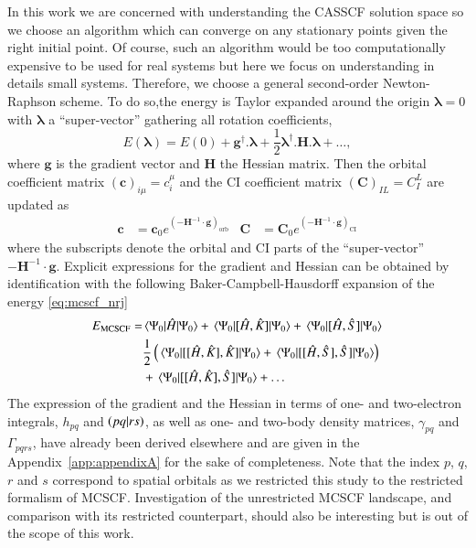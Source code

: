 \documentclass[aps,prb,reprint,showkeys,superscriptaddress]{revtex4-1}
\begin{document}
In this work we are concerned with understanding the CASSCF solution space so we choose an algorithm which can converge on any stationary points given the right initial point.
Of course, such an algorithm would be too computationally expensive to be used for real systems but here we focus on understanding in details small systems.
Therefore, we choose a general second-order Newton-Raphson scheme. \cite{Olsen_1983}
To do so,the energy is Taylor expanded around the origin $\bm{\lambda}=0$ with $\bm{\lambda}$ a ``super-vector'' gathering all rotation coefficients,
\begin{equation}
  \label{eq:mcscf_nrj_taylor}
  E(\bm{\lambda}) = E(0) + \bm{g}^\dagger.\bm{\lambda} + \frac{1}{2} \bm{\lambda}^\dagger.\boldsymbol{H}.\bm{\lambda} + \dots,
\end{equation}
where $\bm{g}$ is the gradient vector and $\bm{H}$ the Hessian matrix.
Then the orbital coefficient matrix $(\bm{c})_{i \mu} = c_i^\mu$ and the CI coefficient matrix $(\bm{C})_{IL} = C_I^L$ are updated as
\begin{align}
  \bm{c} &= \bm{c}_0 e^{(-\bm{H}^{-1}\cdot \bm{g})_{\text{orb}}} & \bm{C} &= \bm{C}_0 e^{(-\bm{H}^{-1}\cdot \bm{g})_{\text{CI}}}
\end{align}
where the subscripts denote the orbital and CI parts of the ``super-vector'' $-\bm{H}^{-1}\cdot \bm{g}$.
Explicit expressions for the gradient and Hessian can be obtained by identification with the following Baker-Campbell-Hausdorff expansion of the energy \eqref{eq:mcscf_nrj}
\begin{equation}
  \label{eq:mcscf_nrj_bch}
  \begin{split}
    E_{\text{MCSCF}} = &\mel{\Psi_0}{\Hat{H}}{\Psi_0} + \mel{\Psi_0}{[\Hat{H},\Hat{K}]}{\Psi_0} + \mel{\Psi_0}{[\Hat{H},\Hat{S}]}{\Psi_0}  \\
    &\frac{1}{2} \left(\mel{\Psi_0}{[[\Hat{H},\Hat{K}],\Hat{K}]}{\Psi_0}+ \mel{\Psi_0}{[[\Hat{H},\Hat{S}],\Hat{S}]}{\Psi_0}\right) \\
    &+ \mel{\Psi_0}{[[\Hat{H},\Hat{K}],\Hat{S}]}{\Psi_0} + \dots
  \end{split}
\end{equation}
The expression of the gradient and the Hessian in terms of one- and two-electron integrals, $h_{pq}$ and  $\ceri{pq}{rs}$, as well as one- and two-body density matrices, $\gamma_{pq}$ and $\Gamma_{pqrs}$, have already been derived elsewhere \cite{Olsen_1983} and are given in the Appendix~\ref{app:appendixA} for the sake of completeness.
Note that the index $p$, $q$, $r$ and $s$ correspond to spatial orbitals as we restricted this study to the restricted formalism of MCSCF.
Investigation of the unrestricted MCSCF landscape, and comparison with its restricted counterpart, should also be interesting but is out of the scope of this work.
\end{document}
